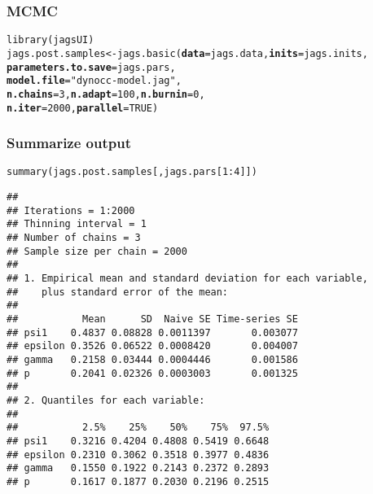 \documentclass[color=usenames,dvipsnames]{beamer}\usepackage[]{graphicx}\usepackage[]{color}
\makeatletter
\newcommand{\hlnum}[1]{\textcolor[rgb]{0.69,0.494,0}{#1}}%
\newcommand{\hlstr}[1]{\textcolor[rgb]{0.749,0.012,0.012}{#1}}%
\newcommand{\hlopt}[1]{\textcolor[rgb]{0,0,0}{#1}}%
\newcommand{\hlstd}[1]{\textcolor[rgb]{0,0,0}{#1}}%
\newcommand{\hlkwb}[1]{\textcolor[rgb]{0,0.341,0.682}{#1}}%
\newcommand{\hlkwc}[1]{\textcolor[rgb]{0,0,0}{\textbf{#1}}}%
\newcommand{\hlkwd}[1]{\textcolor[rgb]{0.004,0.004,0.506}{#1}}%
\newenvironment{kframe}{%
 \def\at@end@of@kframe{}%
 \ifinner\ifhmode%
  \def\at@end@of@kframe{\end{minipage}}%
  \begin{minipage}{\columnwidth}%
 \fi\fi%
 \def\FrameCommand##1{\hskip\@totalleftmargin \hskip-\fboxsep
 \colorbox{shadecolor}{##1}\hskip-\fboxsep
     \hskip-\linewidth \hskip-\@totalleftmargin \hskip\columnwidth}%
 \MakeFramed {\advance\hsize-\width
   \@totalleftmargin\z@ \linewidth\hsize
   \@setminipage}}%
 {\par\unskip\endMakeFramed%
 \at@end@of@kframe}
\newenvironment{knitrout}{}{} %
\makeatother
\begin{document}
\begin{frame}[fragile]
  \frametitle{MCMC}
  \small
\begin{knitrout}\scriptsize
{}\color{fgcolor}\begin{kframe}
\begin{alltt}
\hlkwd{library}\hlstd{(jagsUI)}
\hlstd{jags.post.samples} \hlkwb{<-} \hlkwd{jags.basic}\hlstd{(}\hlkwc{data}\hlstd{=jags.data,} \hlkwc{inits}\hlstd{=jags.inits,}
                                \hlkwc{parameters.to.save}\hlstd{=jags.pars,}
                                \hlkwc{model.file}\hlstd{=}\hlstr{"dynocc-model.jag"}\hlstd{,}
                                \hlkwc{n.chains}\hlstd{=}\hlnum{3}\hlstd{,} \hlkwc{n.adapt}\hlstd{=}\hlnum{100}\hlstd{,} \hlkwc{n.burnin}\hlstd{=}\hlnum{0}\hlstd{,}
                                \hlkwc{n.iter}\hlstd{=}\hlnum{2000}\hlstd{,} \hlkwc{parallel}\hlstd{=}\hlnum{TRUE}\hlstd{)}
\end{alltt}
\end{kframe}
\end{knitrout}
\end{frame}



\begin{frame}[fragile]
  \frametitle{Summarize output}
\begin{knitrout}\tiny
{}\color{fgcolor}\begin{kframe}
\begin{alltt}
\hlkwd{summary}\hlstd{(jags.post.samples[,jags.pars[}\hlnum{1}\hlopt{:}\hlnum{4}\hlstd{]])}
\end{alltt}
\begin{verbatim}
## 
## Iterations = 1:2000
## Thinning interval = 1 
## Number of chains = 3 
## Sample size per chain = 2000 
## 
## 1. Empirical mean and standard deviation for each variable,
##    plus standard error of the mean:
## 
##           Mean      SD  Naive SE Time-series SE
## psi1    0.4837 0.08828 0.0011397       0.003077
## epsilon 0.3526 0.06522 0.0008420       0.004007
## gamma   0.2158 0.03444 0.0004446       0.001586
## p       0.2041 0.02326 0.0003003       0.001325
## 
## 2. Quantiles for each variable:
## 
##           2.5%    25%    50%    75%  97.5%
## psi1    0.3216 0.4204 0.4808 0.5419 0.6648
## epsilon 0.2310 0.3062 0.3518 0.3977 0.4836
## gamma   0.1550 0.1922 0.2143 0.2372 0.2893
## p       0.1617 0.1877 0.2030 0.2196 0.2515
\end{verbatim}
\end{kframe}
\end{knitrout}
\end{frame}
\end{document}

